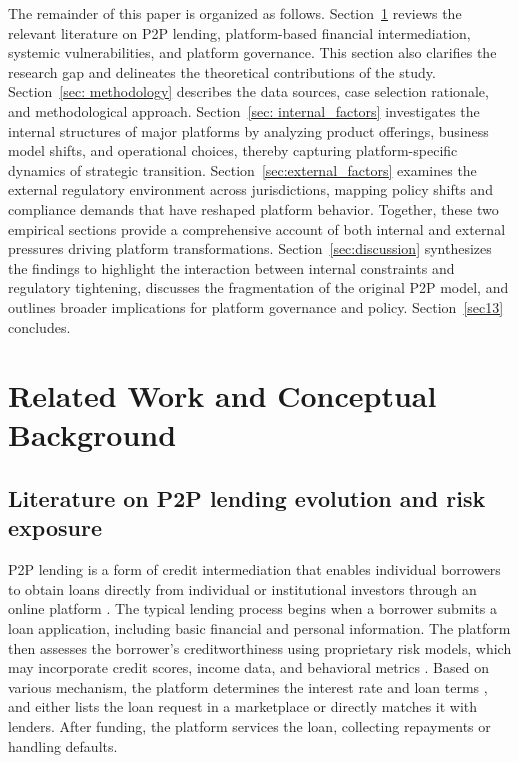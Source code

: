 \documentclass[pdflatex,sn-apa]{sn-jnl}%
\theoremstyle{thmstyleone}%
\theoremstyle{thmstyletwo}%
\theoremstyle{thmstylethree}%
\begin{document}
\textcolor{NavyBlue}{
The remainder of this paper is organized as follows. Section~\ref{sec2} reviews the relevant literature on P2P lending, platform-based financial intermediation, systemic vulnerabilities, and platform governance. This section also clarifies the research gap and delineates the theoretical contributions of the study. Section~\ref{sec: methodology} describes the data sources, case selection rationale, and methodological approach. Section~\ref{sec: internal_factors} investigates the internal structures of major platforms by analyzing product offerings, business model shifts, and operational choices, thereby capturing platform-specific dynamics of strategic transition. Section~\ref{sec:external_factors} examines the external regulatory environment across jurisdictions, mapping policy shifts and compliance demands that have reshaped platform behavior. Together, these two empirical sections provide a comprehensive account of both internal and external pressures driving platform transformations. Section~\ref{sec:discussion} synthesizes the findings to highlight the interaction between internal constraints and regulatory tightening, discusses the fragmentation of the original P2P model, and outlines broader implications for platform governance and policy. Section~\ref{sec13} concludes.
}


\section{Related Work and Conceptual Background}\label{sec2}
\subsection{Literature on P2P lending evolution and risk exposure}\label{sec2.1}
P2P lending is a form of credit intermediation that enables individual borrowers to obtain loans directly from individual or institutional investors through an online platform \citep{eid_bridging_2024}. The typical lending process begins when a borrower submits a loan application, including basic financial and personal information. The platform then assesses the borrower's creditworthiness using proprietary risk models, which may incorporate credit scores, income data, and behavioral metrics \citep{liu_leveraging_2024}. Based on various mechanism, the platform determines the interest rate and loan terms \citep{zhou_bilateral_2019,shen_empirical_2021}, and either lists the loan request in a marketplace or directly matches it with lenders. After funding, the platform services the loan, collecting repayments or handling defaults.
\end{document}
